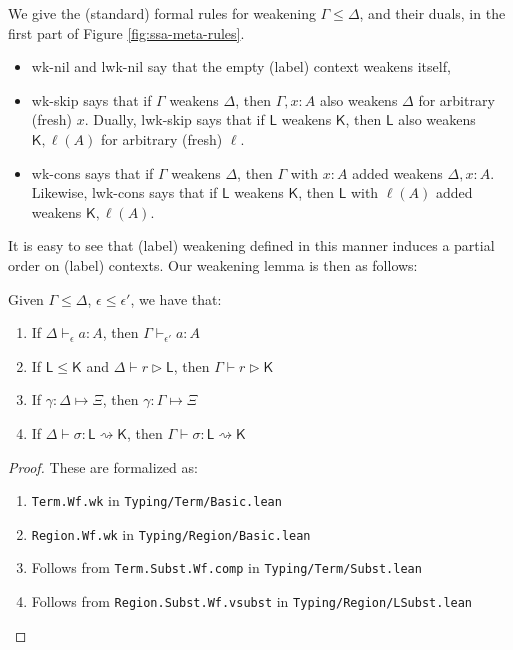 \documentclass[acmsmall,screen,review]{acmart}
\newcommand{\ms}[1]{\ensuremath{\mathsf{#1}}}
\newcommand{\bhyp}[2]{#1 : #2}
\newcommand{\lhyp}[2]{#1(#2)}
\newcommand{\hasty}[4]{#1 \vdash_{#2} #3: {#4}}
\newcommand{\haslb}[3]{#1 \vdash #2 \rhd #3}
\newcommand{\issubst}[3]{#1: #2 \mapsto #3}
\newcommand{\lbsubst}[4]{#1 \vdash #2: #3 \rightsquigarrow #4}
\newcommand{\brle}[1]{{\textsf{#1}}}
\begin{document}
We give the (standard) formal rules for weakening $\Gamma \leq \Delta$, and their duals, in the
first part of Figure \ref{fig:ssa-meta-rules}.
\begin{itemize}
  \item \brle{wk-nil} and \brle{lwk-nil} say that the empty (label) context weakens itself,
  \item \brle{wk-skip} says that if $\Gamma$ weakens $\Delta$, then $\Gamma, x: A$ also weakens
  $\Delta$ for arbitrary (fresh) $x$. Dually, \brle{lwk-skip} says that if $\ms{L}$ weakens
  $\ms{K}$, then $\ms{L}$ also weakens $\ms{K}, \lhyp{\ell}{A}$ for arbitrary (fresh) $\ell$.
  \item \brle{wk-cons} says that if $\Gamma$ weakens $\Delta$, then $\Gamma$ with $\bhyp{x}{A}$
  added weakens $\Delta, \bhyp{x}{A}$. Likewise, \brle{lwk-cons} says that if $\ms{L}$ weakens
  $\ms{K}$, then $\ms{L}$ with $\lhyp{\ell}{A}$ added weakens $\ms{K}, \lhyp{\ell}{A}$.
\end{itemize}
It is easy to see that (label) weakening defined in this manner induces a partial order on (label)
contexts. Our weakening lemma is then as follows:
\begin{lemma}[Weakening]
  Given $\Gamma \leq \Delta$, $\epsilon \leq \epsilon'$, we have that:
  \begin{enumerate}[label=(\alph*)]
    \item If $\hasty{\Delta}{\epsilon}{a}{A}$, then $\hasty{\Gamma}{\epsilon'}{a}{A}$
    \item If $\ms{L} \leq \ms{K}$ and $\haslb{\Delta}{r}{\ms{L}}$, then $\haslb{\Gamma}{r}{\ms{K}}$
    \item If $\issubst{\gamma}{\Delta}{\Xi}$, then $\issubst{\gamma}{\Gamma}{\Xi}$
    \item If $\lbsubst{\Delta}{\sigma}{\ms{L}}{\ms{K}}$, then
    $\lbsubst{\Gamma}{\sigma}{\ms{L}}{\ms{K}}$
  \end{enumerate}
\end{lemma}
\begin{proof}
  These are formalized as:
  \begin{enumerate}[label=(\alph*)]
    \item \texttt{Term.Wf.wk} in \texttt{Typing/Term/Basic.lean}
    \item \texttt{Region.Wf.wk} in \texttt{Typing/Region/Basic.lean}
    \item Follows from \texttt{Term.Subst.Wf.comp} in \texttt{Typing/Term/Subst.lean}
    \item Follows from \texttt{Region.Subst.Wf.vsubst} in \texttt{Typing/Region/LSubst.lean}
  \end{enumerate}
\end{proof}
\end{document}
